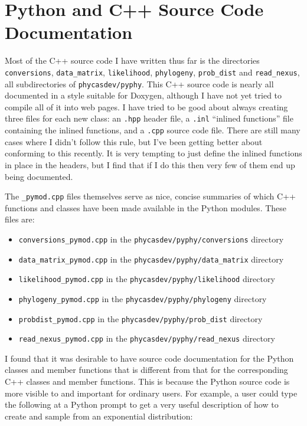 \documentclass[10pt]{article}
\begin{document}
\section{Python and C++ Source Code Documentation}

Most of the C++ source code I have written thus far is the directories {\tt conversions}, {\tt data\_matrix}, {\tt likelihood}, {\tt phylogeny}, {\tt prob\_dist} and {\tt read\_nexus}, all subdirectories of {\tt phycasdev/pyphy}. This C++ source code is nearly all documented in a style suitable for Doxygen, although I have not yet tried to compile all of it into web pages. I have tried to be good about always creating three files for each new class: an {\tt .hpp} header file, a {\tt .inl} ``inlined functions'' file containing the inlined functions, and a {\tt .cpp} source code file. There are still many cases where I didn't follow this rule, but I've been getting better about conforming to this recently. It is very tempting to just define the inlined functions in place in the headers, but I find that if I do this then very few of them end up being documented.

The {\tt *\_pymod.cpp} files themselves serve as nice, concise summaries of which C++ functions and classes have been made available in the Python modules. These files are: 
\begin{itemize}
\item[] {\tt conversions\_pymod.cpp} in the {\tt phycasdev/pyphy/conversions} directory
\item[] {\tt data\_matrix\_pymod.cpp} in the {\tt phycasdev/pyphy/data\_matrix} directory
\item[] {\tt likelihood\_pymod.cpp} in the {\tt phycasdev/pyphy/likelihood} directory
\item[] {\tt phylogeny\_pymod.cpp} in the {\tt phycasdev/pyphy/phylogeny} directory
\item[] {\tt probdist\_pymod.cpp} in the {\tt phycasdev/pyphy/prob\_dist} directory
\item[] {\tt read\_nexus\_pymod.cpp} in the {\tt phycasdev/pyphy/read\_nexus} directory
\end{itemize}

I found that it was desirable to have source code documentation for the Python classes and member functions that is different from that for the corresponding C++ classes and member functions. This is because the Python source code is more visible to and important for ordinary users. For example, a user could type the following at a Python prompt to get a very useful description of how to create and sample from an exponential distribution:
\end{document}

